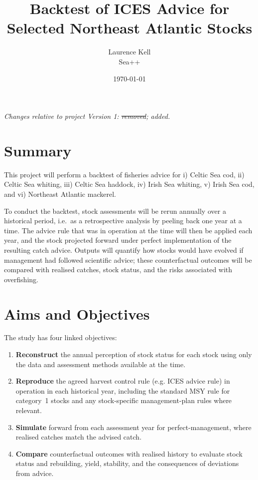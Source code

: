 \documentclass[11pt,a4paper]{extarticle}
\title{Backtest of ICES Advice for Selected Northeast Atlantic Stocks}
\author{%
	Laurence Kell\\
	\small Sea++
}
\date{\small \today}
\newcommand{\removed}[1]{\sout{#1}}
\newcommand{\addedinline}[1]{\colorbox{yellow!35}{#1}}
\begin{document}
	
	\maketitle
	
	{\small\textit{Changes relative to project Version 1: \removed{removed}; \addedinline{added}.}}
	
	\section*{Summary}
	
	This project will perform a backtest of fisheries advice for i) Celtic Sea cod, ii) Celtic Sea whiting, iii) Celtic Sea haddock, iv) Irish Sea whiting, v) Irish Sea cod, and vi) Northeast Atlantic mackerel.
	
	To conduct the backtest, stock assessments will be rerun annually over a historical period, i.e.\ as a retrospective analysis by peeling back one year at a time. The advice rule that was in operation at the time will then be applied each year, and the stock projected forward under perfect implementation of the resulting catch advice. Outputs will quantify how stocks would have evolved if management had followed scientific advice; these counterfactual outcomes will be compared with realised catches, stock status, and the risks associated with overfishing.
	
	\section*{Aims and Objectives}
	
	The study has four linked objectives:
	
	\begin{enumerate}
		\item \textbf{Reconstruct} the annual perception of stock status for each stock using only the data and assessment methods available at the time.
		\item \textbf{Reproduce} the agreed harvest control rule (e.g. ICES advice rule) in operation in each historical year, including the standard MSY rule for category~1 stocks and any stock-specific management-plan rules where relevant.
		\item \textbf{Simulate} forward from each assessment year for perfect-management, where realised catches match the advised catch.
		\item \textbf{Compare} counterfactual outcomes with realised history to evaluate stock status and rebuilding, yield, stability, and the consequences of deviations from advice.
	\end{enumerate}
	
\end{document}
